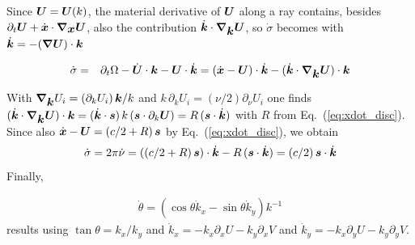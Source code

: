 \documentclass[12pt]{article}
\newif\ifdetail
\newcommand{\beq}  { \begin{eqnarray} }
\newcommand{\eeq}  { \end{eqnarray}}
\newcommand{\eq }  [1]{Eq.~(\ref{#1})}  %
\renewcommand{\v}[1]{{\mbox{\boldmath$ #1 $}}}  %
\newcommand{\p}{{\partial}}
\newcommand{\vn}{{\v \nabla}}
\newcommand{\lk}{\left(}
\newcommand{\rk}{\right)}
\begin{document}
Since $\v U = \v U(k)$, the material derivative of $\v U$ along a ray contains,
besides $\p_t \v U + \dot{\v x} \cdot \vn_{\v x} \v U$,  also the contribution
$\dot{\v k} \cdot \vn_{\v k} \v U$, so  $\dot \sigma$
becomes
with %
$\dot{\v k} =  - (\vn \v U )\cdot \v k $
\ifdetail
\beq
\dot \sigma  &=& 2 \pi \dot \nu =   \p_t \Omega - \dot{\v U}  \cdot \v k  - \v U \cdot \dot{\v k}
\\
&=&  \p_t \Omega -  \dot U k_x + \dot V k_y  - \v U \cdot \dot{\v k}
\\ &=&  \p_t \Omega -  (\p_t U + \v u \cdot \vn_x U + \dot{\v k} \cdot \vn_{\v k} U) k_x + \dot V k_y  - \v U \cdot \dot{\v k}
\\ &=& (\p_t \v U ) \cdot \v k 
-  (\p_t \v U ) \cdot \v k -  ( \dot{\v x} \cdot \vn_x \v U) \cdot \v k 
-(\dot{\v k} \cdot \vn_{\v k} \v U) \cdot \v k
-  \v U \cdot \dot{\v k} 
\\ &=& -  ( \dot{\v x} \cdot \vn_x \v U) \cdot \v k 
-(\dot{\v k} \cdot \vn_{\v k} \v U) \cdot \v k
+  \v U \cdot  ( (\vn \v U )\cdot \v k )
\\
&=&  -   \dot{\v x} \cdot ((\vn_x \v U)  \cdot \v k) +  \v U \cdot  ( (\vn \v U )\cdot \v k )
-(\dot{\v k} \cdot \vn_{\v k} \v U) \cdot \v k
\\ &=& -( \v U  -   \dot{\v x} ) \cdot \dot \v k-(\dot{\v k} \cdot \vn_{\v k} \v U) \cdot \v k
\eeq
\fi
\beq \label{eq:omdot_Uk}
\dot \sigma &=& \p_t \Omega - \dot{\v U} \cdot \v k - \v U \cdot \dot{\v k}
 =  ( \dot{\v x}   - \v U ) \cdot \dot{\v k}
   - ( \dot{\v k} \cdot \vn_{\v k} \v U ) \cdot \v k
\eeq
\ifdetail
\beq
 ( \dot{\v k} \cdot \vn_{\v k} \v U ) \cdot \v k 
 &=&  (\dot{\v k} \cdot \vn_{\v k} U) k_x +  (\dot{\v k} \cdot \vn_{\v k}) V k_y
 \\ &=&  (\dot{k_x} \p_{k_x} U +(\dot{k_y} \p_{k_y} U ) k_x +  (\dot{\v k} \cdot \vn_{\v k}) V k_y
 \\ &=&  (\dot{k_x} \p_{k} U k_x/k +(\dot{k_y} \p_{k} U k_y/k) k_x +  (\dot{\v k} \cdot \vn_{\v k}) V k_y
 \\ &=& \p_{k} U  (\dot{\v k} \cdot \v k) k_x /k  + \p_{k} V  (\dot{\v k} \cdot \v k )  k_y/k
 =  k (\dot{\v k} \cdot \v s)  ( \p_k \v U \cdot \v s)
\eeq  
with $ \p_{k_x} k  = k_x/k$.
\fi
With $\vn_{\v k} U_i = (\p_k U_i) \, \v k /k$ and $k \, \p_k U_i = (\nu/2) \p_\nu U_i$
one finds
$( \dot{\v k} \cdot \vn_{\v k} \v U ) \cdot \v k
 = ( \dot{\v k} \cdot \v s ) \, k \lk \v s \cdot \p_k \v U \rk
 = R \, ( \v s \cdot \dot{\v k} )$
with $R$ from \eq{eq:xdot_disc}. Since also
$\dot{\v x} - \v U = (c/2 + R) \, \v s$ by \eq{eq:xdot_disc}, we obtain
\beq \label{eq:omdot_final}
\dot \sigma = 2 \pi \dot \nu = 
 (  (c/2 + R) \, \v s ) \cdot \dot{\v k}
   -  R \, ( \v s \cdot \dot{\v k} ) 
=
(c/2) \, \v s \cdot \dot{\v k}
\eeq
Finally,
\ifdetail
\beq
\tan \theta &=& k_x/k_y ~~\to ~~ \dot \theta /\cos^2\theta = (1/k_y) \dot k_x - (k_x/k_y^2) \dot k_y 
\eeq
\fi
\beq
\dot \theta = ( \cos\theta   \dot k_x -    \sin \theta \dot k_y ) k^{-1}
\eeq
results
using $\tan \theta = k_x/k_y$ and 
$\dot k_x = -  k_x \p_x U - k_y \p_x V $ and  $\dot k_y = - k_x \p_y  U   -k_y \p_y  V $.
\end{document}
